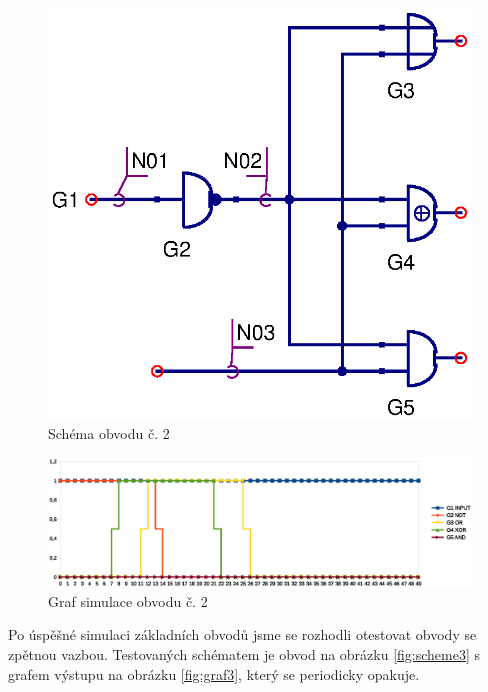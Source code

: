\documentclass[11pt,a4paper]{article}
\begin{document}
			\begin{figure}[!htb]
					\centering
						\includegraphics[scale=.5]{input2.eps}
						\caption{Schéma obvodu č. 2}
						\label{fig:scheme2}
			\end{figure}

			\begin{figure}[!htb]
				\centering
					\includegraphics[scale=.6]{graf2.eps}
					\caption{Graf simulace obvodu č. 2}
					\label{fig:graf2}
			\end{figure}

			Po úspěšné simulaci základních obvodů jsme se rozhodli otestovat obvody se zpětnou vazbou. Testovaných schématem je obvod na obrázku \ref{fig:scheme3} s grafem výstupu na obrázku \ref{fig:graf3}, který se periodicky opakuje.
\end{document}
